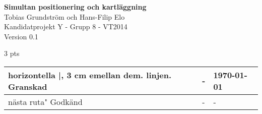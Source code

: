 \documentclass[a4paper,12pt,fleqn]{article} \usepackage{fixltx2e}
\begin{document}
 \pagestyle{fancy}  \vspace*{\fill}
\begingroup \begin{center} \huge{\textbf{Simultan positionering och
kartläggning}} \\ \vspace{10pt} \normalsize Tobias Grundström och
Hans-Filip Elo \\ Kandidatprojekt Y - Grupp 8 - VT2014 \\ Version 0.1
\end{center} \endgroup \vspace*{\fill}

	\begin{center} %
	3 pts \begin{tabular}{| p{3cm} | p{3cm} | p{3cm} |} %
	horizontella |, 3 cm emellan dem. \hline %
	linjen. Granskad & - & \today \\ \hline %
	nästa ruta" Godkänd & - & - \\ \hline %

	    \end{tabular} \end{center} \vspace{2cm} \newpage
%
\end{document}
